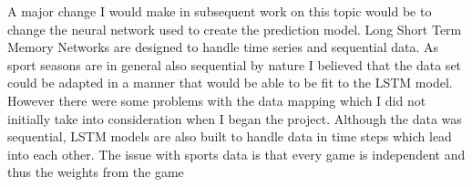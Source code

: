 \documentclass{imc-inf}
\begin{document}
	A major change I would make in subsequent work on this topic would be to change the neural network used to create the prediction model. Long Short Term Memory Networks are designed to handle time series and sequential data. As sport seasons are in general also sequential by nature I believed that the data set could be adapted in a manner that would be able to be fit to the LSTM model. However there were some problems with the data mapping which I did not initially take into consideration when I began the project. Although the data was sequential, LSTM models are also built to handle data in time steps which lead into each other. The issue with sports data is that every game is independent and thus the weights from the game
	\newpage
	
	
	
\end{document}
